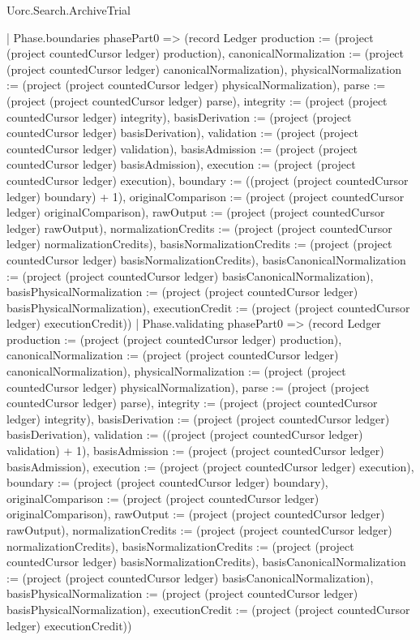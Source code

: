 \begin{lexlean}{Uorc.Search.ArchiveTrial}
\begin{semanticmodule}
{{    | Phase.boundaries phasePart0 => (record Ledger {production := (project (project countedCursor ledger) production), canonicalNormalization := (project (project countedCursor ledger) canonicalNormalization), physicalNormalization := (project (project countedCursor ledger) physicalNormalization), parse := (project (project countedCursor ledger) parse), integrity := (project (project countedCursor ledger) integrity), basisDerivation := (project (project countedCursor ledger) basisDerivation), validation := (project (project countedCursor ledger) validation), basisAdmission := (project (project countedCursor ledger) basisAdmission), execution := (project (project countedCursor ledger) execution), boundary := ((project (project countedCursor ledger) boundary) + 1), originalComparison := (project (project countedCursor ledger) originalComparison), rawOutput := (project (project countedCursor ledger) rawOutput), normalizationCredits := (project (project countedCursor ledger) normalizationCredits), basisNormalizationCredits := (project (project countedCursor ledger) basisNormalizationCredits), basisCanonicalNormalization := (project (project countedCursor ledger) basisCanonicalNormalization), basisPhysicalNormalization := (project (project countedCursor ledger) basisPhysicalNormalization), executionCredit := (project (project countedCursor ledger) executionCredit)})
    | Phase.validating phasePart0 => (record Ledger {production := (project (project countedCursor ledger) production), canonicalNormalization := (project (project countedCursor ledger) canonicalNormalization), physicalNormalization := (project (project countedCursor ledger) physicalNormalization), parse := (project (project countedCursor ledger) parse), integrity := (project (project countedCursor ledger) integrity), basisDerivation := (project (project countedCursor ledger) basisDerivation), validation := ((project (project countedCursor ledger) validation) + 1), basisAdmission := (project (project countedCursor ledger) basisAdmission), execution := (project (project countedCursor ledger) execution), boundary := (project (project countedCursor ledger) boundary), originalComparison := (project (project countedCursor ledger) originalComparison), rawOutput := (project (project countedCursor ledger) rawOutput), normalizationCredits := (project (project countedCursor ledger) normalizationCredits), basisNormalizationCredits := (project (project countedCursor ledger) basisNormalizationCredits), basisCanonicalNormalization := (project (project countedCursor ledger) basisCanonicalNormalization), basisPhysicalNormalization := (project (project countedCursor ledger) basisPhysicalNormalization), executionCredit := (project (project countedCursor ledger) executionCredit)})
}}
\end{semanticmodule}
\end{lexlean}
